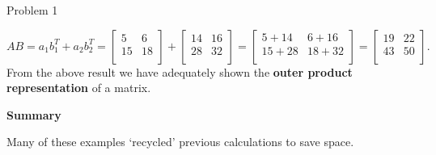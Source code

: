 \begin{problem}{Problem 1}
\begin{highlight}[Solution]
        \begin{equation*}
            AB = a_{1}b_{1}^{T} + a_{2}b_{2}^{T} = 
            \begin{bmatrix}
                5 & 6 \\
                15 & 18 \\
            \end{bmatrix}
            + 
            \begin{bmatrix}
                14 & 16 \\
                28 & 32 \\
            \end{bmatrix}
            = 
            \begin{bmatrix}
                5 + 14 & 6 + 16 \\
                15 + 28 & 18 + 32 \\
            \end{bmatrix}
            = 
            \begin{bmatrix}
                19 & 22 \\
                43 & 50 \\
            \end{bmatrix}.
        \end{equation*}
        From the above result we have adequately shown the \textbf{outer product representation} of a matrix. \vspace*{1em}

        \noindent \textbf{Summary} \vspace*{1em}

        Many of these examples `recycled' previous calculations to save space.
    \end{highlight}
\end{problem}

